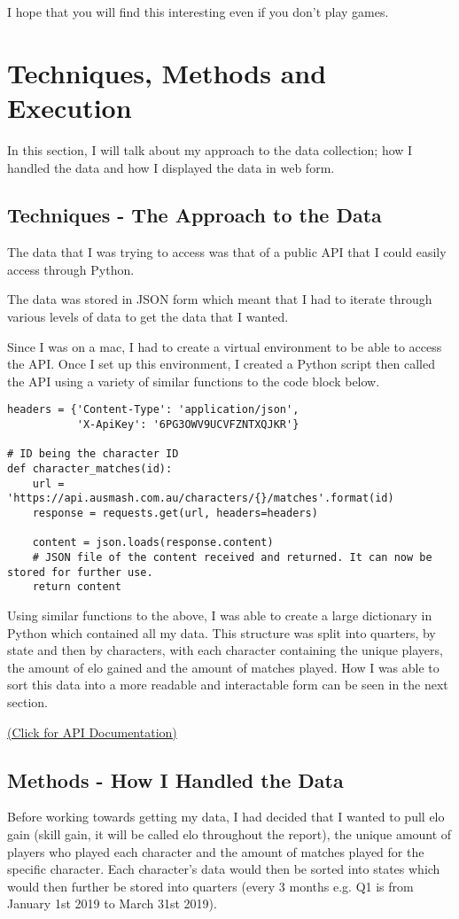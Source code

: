 \documentclass[11pt, oneside, a4paper]{article}
\begin{document}
I hope that you will find this interesting even if you don't play games.

\section{Techniques, Methods and Execution}
In this section, I will talk about my approach to the data collection; how I handled the data and how I displayed the data in web form.
\subsection{Techniques - The Approach to the Data}
The data that I was trying to access was that of a public API that I could easily access through Python. 

The data was stored in JSON form which meant that I had to iterate through various levels of data to get the data that I wanted. 

Since I was on a mac, I had to create a virtual environment to be able to access the API. Once I set up this environment, I created a Python script then called the API using a variety of similar functions to the code block below.

\begin{lstlisting}    
headers = {'Content-Type': 'application/json',
           'X-ApiKey': '6PG3OWV9UCVFZNTXQJKR'}

# ID being the character ID
def character_matches(id):
    url = 'https://api.ausmash.com.au/characters/{}/matches'.format(id)
    response = requests.get(url, headers=headers)
    
    content = json.loads(response.content)
    # JSON file of the content received and returned. It can now be stored for further use.
    return content

\end{lstlisting}

Using similar functions to the above, I was able to create a large dictionary in Python which contained all my data. This structure was split into quarters, by state and then by characters, with each character containing the unique players, the amount of elo gained and the amount of matches played. How I was able to sort this data into a more readable and interactable form can be seen in the next section.

\href{https://api.ausmash.com.au/swagger/ui/index#/}{(Click for API Documentation)}

\subsection{Methods - How I Handled the Data}
Before working towards getting my data, I had decided that I wanted to pull elo gain (skill gain, it will be called elo throughout the report), the unique amount of players who played each character and the amount of matches played for the specific character. Each character's data would then be sorted into states which would then further be stored into quarters (every 3 months e.g. Q1 is from January 1st 2019 to March 31st 2019).
\end{document}
